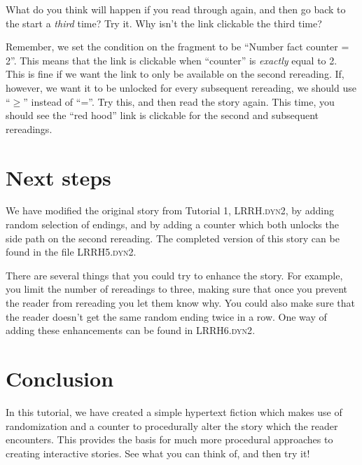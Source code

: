 \documentclass{article}
\begin{document}
What do you think will happen if you read through again, and then go 
back to the start a \textit{third} time? Try it. Why isn't the link clickable the third time?

Remember, we set the condition on the fragment to be ``Number fact counter = 2''. This means that the link is clickable when ``counter'' is \textit{exactly} equal to 2. This is fine if we want the link to only be available on the second rereading. If, however, we want it to be unlocked for every subsequent rereading, we should use ``$\ge$'' instead of ``=''. Try this, and then read the story again. This time, you should see the ``red hood'' link is clickable for the second and subsequent rereadings.



\section{Next steps}

We have modified the original story from Tutorial 1, \textsc{LRRH.dyn2}, by adding random selection of endings, and by adding a counter which both unlocks the side path on the second rereading. The completed version of this story can be found in the file \textsc{LRRH5.dyn2}. 

There are several things that you could try to enhance the story. For  example, you limit the number of rereadings to three, making sure that once 
you prevent the reader from rereading you let them know why. You could also make sure that the reader doesn't get the same random ending twice in a row. One way of adding these enhancements can be found in \textsc{LRRH6.dyn2}. 

\section{Conclusion}

In this tutorial, we have created a simple hypertext fiction which makes use of randomization and a counter to procedurally alter the story which the reader encounters. This provides the basis for much more procedural approaches to creating interactive stories. See what you can think of, and then try it!
\end{document}
